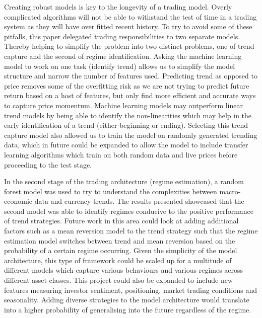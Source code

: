 \documentclass[11pt]{article}
\begin{document}
\par Creating robust models is key to the longevity of a trading model. Overly complicated algorithms will not be able to withstand the test of time in a trading system as they will have over fitted recent history. To try to avoid some of these pitfalls, this paper delegated trading responsibilities to two separate models. Thereby helping to simplify the problem into two distinct problems, one of trend capture and the second of regime identification. Asking the machine learning model to work on one task (identify trend) allows us to simplify the model structure and narrow the number of features used. Predicting trend as opposed to price removes some of the overfitting risk as we are not trying to predict future return based on a host of features, but only find more efficient and accurate ways to capture price momentum. Machine learning models may outperform linear trend models by being able to identify the non-linearities which may help in the early identification of a trend (either beginning or ending). Selecting this trend capture model also allowed us to train the model on randomly generated trending data, which in future could be expanded to allow the model to include transfer learning algorithms which train on both random data and live prices before proceeding to the test stage.
\vspace{4mm}
\par In the second stage of the trading architecture (regime estimation), a random forest model was used to try to understand the complexities between macro-economic data and currency trends. The results presented showcased that the second model was able to identify regimes conducive to the positive performance of trend strategies. Future work in this area could look at adding additional factors such as a mean reversion model to the trend strategy such that the regime estimation model switches between trend and mean reversion based on the probability of a certain regime occurring. Given the simplicity of the model architecture, this type of framework could be scaled up for a multitude of different models which capture various behaviours and various regimes across different asset classes. This project could also be expanded to include new features measuring investor sentiment, positioning, market trading conditions and seasonality. Adding diverse strategies to the model architecture would translate into a higher probability of generalising into the future regardless of the regime.
\vspace{4mm}
\end{document}
